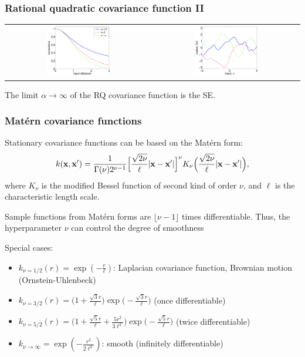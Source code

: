 \begin{frame}
\frametitle{Rational quadratic covariance function II}

\begin{center}
\begin{tabular}{cc}
\includegraphics[width=0.45\textwidth]{rq} &
\includegraphics[width=0.45\textwidth]{rq2}
\end{tabular}
\end{center}

The limit $\alpha\rightarrow\infty$ of the RQ covariance function is the SE.

\end{frame}

\begin{frame}
\frametitle{Matérn covariance functions}

Stationary covariance functions can be based on the Matérn form:
\[
k({\bf x},{\bf x}')=\frac{1}{\Gamma(\nu)2^{\nu-1}}\Big[
\frac{\sqrt{2\nu}}{\ell}|{\bf x}-{\bf x}'|\Big]^\nu K_\nu
\Big(\frac{\sqrt{2\nu}}{\ell}|{\bf x}-{\bf x}'|\Big),
\]
where $K_\nu$ is the modified Bessel function of second kind of order $\nu$,
and $\ell$ is the characteristic length scale.

Sample functions from Matérn forms are $\lfloor \nu-1\rfloor$ times
differentiable. Thus, the hyperparameter $\nu$ can control the degree of
smoothness

Special cases:
\begin{itemize}
\item $k_{\nu=1/2}(r)=\exp(-\frac{r}{\ell})$: Laplacian covariance function,
Brownian motion (Ornstein-Uhlenbeck)
\item $k_{\nu=3/2}(r)=\big(1+\frac{\sqrt{3}r}{\ell}\big)
\exp\big(\!-\frac{\sqrt{3}r}{\ell}\big)$ (once differentiable)
\item $k_{\nu=5/2}(r)=\big(1+\frac{\sqrt{5}r}{\ell}+\frac{5r^2}{3\ell^2}\big)
\exp\big(\!-\frac{\sqrt{5}r}{\ell}\big)$ (twice differentiable)
\item $k_{\nu\rightarrow\infty}=\exp(-\frac{r^2}{2\ell^2})$: smooth
(infinitely differentiable)
\end{itemize}
\end{frame}

